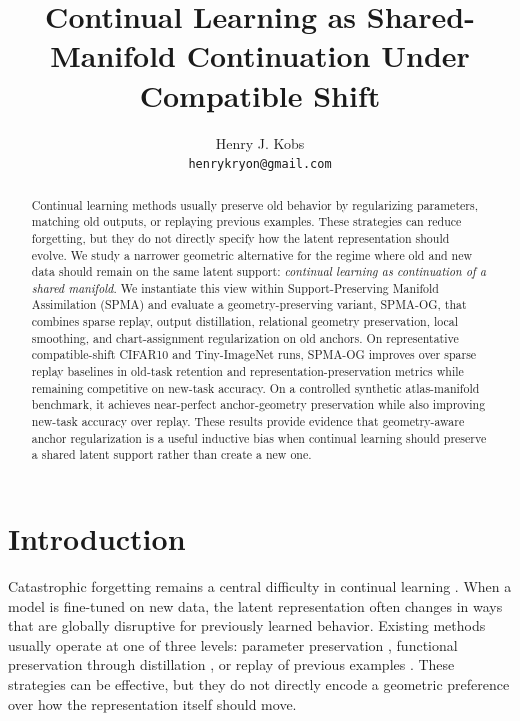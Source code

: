 \documentclass[11pt]{article}
\title{Continual Learning as Shared-Manifold Continuation Under Compatible Shift}
\author{Henry J. Kobs\\\texttt{henrykryon@gmail.com}}
\date{}
\newcommand{\method}{\textsc{SPMA-OG}}
\newcommand{\spma}{\textsc{SPMA}}
\begin{document}
\maketitle

\begin{abstract}
Continual learning methods usually preserve old behavior by regularizing parameters, matching old outputs, or replaying previous examples. These strategies can reduce forgetting, but they do not directly specify how the latent representation should evolve. We study a narrower geometric alternative for the regime where old and new data should remain on the same latent support: \emph{continual learning as continuation of a shared manifold}. We instantiate this view within Support-Preserving Manifold Assimilation (\spma{}) and evaluate a geometry-preserving variant, \method{}, that combines sparse replay, output distillation, relational geometry preservation, local smoothing, and chart-assignment regularization on old anchors. On representative compatible-shift CIFAR10 and Tiny-ImageNet runs, \method{} improves over sparse replay baselines in old-task retention and representation-preservation metrics while remaining competitive on new-task accuracy. On a controlled synthetic atlas-manifold benchmark, it achieves near-perfect anchor-geometry preservation while also improving new-task accuracy over replay. These results provide evidence that geometry-aware anchor regularization is a useful inductive bias when continual learning should preserve a shared latent support rather than create a new one.
\end{abstract}

\section{Introduction}
Catastrophic forgetting remains a central difficulty in continual learning \citep{delange2022survey}. When a model is fine-tuned on new data, the latent representation often changes in ways that are globally disruptive for previously learned behavior. Existing methods usually operate at one of three levels: parameter preservation \citep{kirkpatrick2017ewc,zenke2017si,aljundi2018mas}, functional preservation through distillation \citep{hinton2015distilling,li2017lwf}, or replay of previous examples \citep{lopez2017gem,chaudhry2019agem,rolnick2019experience,buzzega2020dark}. These strategies can be effective, but they do not directly encode a geometric preference over how the representation itself should move.
\end{document}
